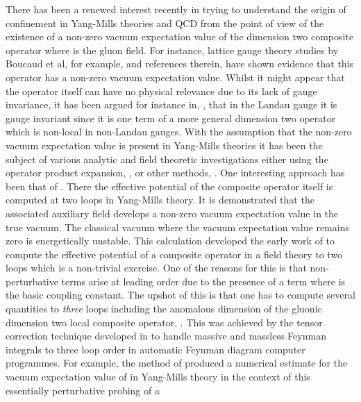 \documentclass[a4paper,11pt]{article}
\providecommand{\half}{\mbox{\small{\myHighlight{$\frac{1}{2}$}\coordHE{}}}}
\begin{document}
\newpage 
There has been a renewed interest recently in trying to understand the origin 
of confinement in Yang-Mills theories and QCD from the point of view of the
existence of a non-zero vacuum expectation value of the dimension two composite
operator \myHighlight{$\half A^{a \, 2}_\mu$}\coordHE{} where \coordHE{} is the gluon field. For 
instance, lattice gauge theory studies by Boucaud et al, for example, \cite{1}
and references therein, have shown evidence that this operator has a non-zero 
vacuum expectation value. Whilst it might appear that the operator itself can 
have no physical relevance due to its lack of gauge invariance, it has been 
argued for instance in, \cite{2}, that in the Landau gauge it is gauge 
invariant since it is one term of a more general dimension two operator which 
is non-local in non-Landau gauges. With the assumption that the non-zero vacuum 
expectation value \myHighlight{$\langle \half A^{a \, 2}_\mu \rangle$}\coordHE{} is present in 
Yang-Mills theories it has been the subject of various analytic and field 
theoretic investigations either using the operator product expansion, 
\cite{3,4,5}, or other methods, \cite{2,6,7,8,9,10,11,12,13}. One interesting
approach has been that of \cite{2}. There the effective potential of the 
composite operator itself is computed at two loops in \coordHE{} Yang-Mills 
theory. It is demonstrated that the associated auxiliary field develops a 
non-zero vacuum expectation value in the true vacuum. The classical vacuum
where the vacuum expectation value remains zero is energetically unstable. This
calculation developed the early work of \cite{14,15} to compute the effective
potential of a composite operator in a field theory to two loops which is a 
non-trivial exercise. One of the reasons for this is that non-perturbative 
terms arise at leading order due to the presence of a \coordHE{} term where \coordHE{} is
the basic coupling constant. The upshot of this is that one has to compute 
several quantities to {\em three} loops including the anomalous dimension of 
the gluonic dimension two local composite operator, \cite{2}. This was achieved
by the tensor correction technique developed in \cite{16} to handle massive and 
massless Feynman integrals to three loop order in automatic Feynman diagram 
computer programmes. For example, the method of \cite{2} produced a numerical 
estimate for the vacuum expectation value of \myHighlight{$\half A^{a \, 2}_\mu$}\coordHE{} in 
Yang-Mills theory in the context of this essentially perturbative probing of a 
\end{document}
